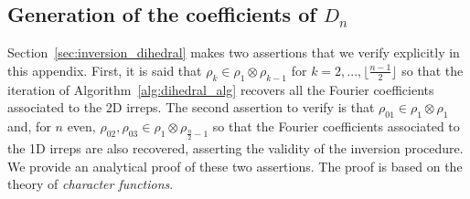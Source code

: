 \documentclass{article}
\theoremstyle{plain}
\theoremstyle{definition}
\theoremstyle{remark}
\begin{document}
\subsection{Generation of the coefficients of $D_n$}\label{app:generating_dihedral}
Section~\ref{sec:inversion_dihedral} makes two assertions that we verify explicitly in this appendix. First, it is said that $\rho_{k}\in\rho_1\otimes\rho_{k-1}$ for $k = 2,...,\lfloor\frac{n-1}{2}\rfloor$ so that the iteration of Algorithm~\ref{alg:dihedral_alg} recovers all the Fourier coefficients associated to the 2D irreps. The second assertion to verify is that $\rho_{01}\in \rho_1\otimes\rho_1$ and, for $n$ even,  $\rho_{02},\rho_{03}\in\rho_1\otimes\rho_{\frac{n}{2}-1}$ so that the Fourier coefficients associated to the 1D irreps are also recovered, asserting the validity of the inversion procedure. We provide an analytical proof of these two assertions. The proof is based on the theory of \emph{character functions}.
\end{document}
